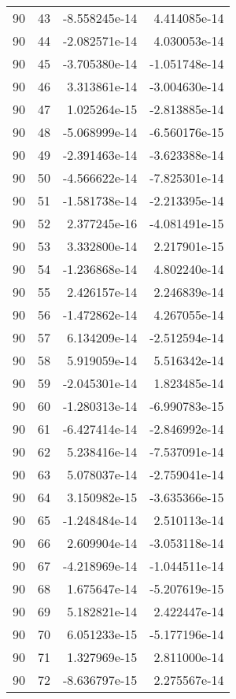 \begin{tabular}{rrrr}
  90 &   43 & -8.558245e-14 &  4.414085e-14 \\
  90 &   44 & -2.082571e-14 &  4.030053e-14 \\
  90 &   45 & -3.705380e-14 & -1.051748e-14 \\
  90 &   46 &  3.313861e-14 & -3.004630e-14 \\
  90 &   47 &  1.025264e-15 & -2.813885e-14 \\
  90 &   48 & -5.068999e-14 & -6.560176e-15 \\
  90 &   49 & -2.391463e-14 & -3.623388e-14 \\
  90 &   50 & -4.566622e-14 & -7.825301e-14 \\
  90 &   51 & -1.581738e-14 & -2.213395e-14 \\
  90 &   52 &  2.377245e-16 & -4.081491e-15 \\
  90 &   53 &  3.332800e-14 &  2.217901e-15 \\
  90 &   54 & -1.236868e-14 &  4.802240e-14 \\
  90 &   55 &  2.426157e-14 &  2.246839e-14 \\
  90 &   56 & -1.472862e-14 &  4.267055e-14 \\
  90 &   57 &  6.134209e-14 & -2.512594e-14 \\
  90 &   58 &  5.919059e-14 &  5.516342e-14 \\
  90 &   59 & -2.045301e-14 &  1.823485e-14 \\
  90 &   60 & -1.280313e-14 & -6.990783e-15 \\
  90 &   61 & -6.427414e-14 & -2.846992e-14 \\
  90 &   62 &  5.238416e-14 & -7.537091e-14 \\
  90 &   63 &  5.078037e-14 & -2.759041e-14 \\
  90 &   64 &  3.150982e-15 & -3.635366e-15 \\
  90 &   65 & -1.248484e-14 &  2.510113e-14 \\
  90 &   66 &  2.609904e-14 & -3.053118e-14 \\
  90 &   67 & -4.218969e-14 & -1.044511e-14 \\
  90 &   68 &  1.675647e-14 & -5.207619e-15 \\
  90 &   69 &  5.182821e-14 &  2.422447e-14 \\
  90 &   70 &  6.051233e-15 & -5.177196e-14 \\
  90 &   71 &  1.327969e-15 &  2.811000e-14 \\
  90 &   72 & -8.636797e-15 &  2.275567e-14 \\

\end{tabular}
